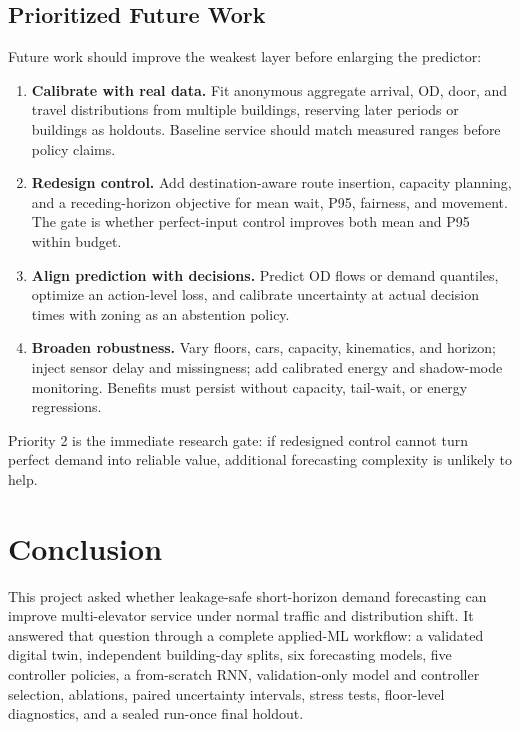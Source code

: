 \documentclass[12pt]{article}
\begin{document}
\subsection{Prioritized Future Work}

Future work should improve the weakest layer before enlarging the predictor:

\begin{enumerate}[leftmargin=0.34in,itemsep=0.20em,topsep=0.20em]
  \item \textbf{Calibrate with real data.} Fit anonymous aggregate arrival, OD,
    door, and travel distributions from multiple buildings, reserving later
    periods or buildings as holdouts. Baseline service should match measured
    ranges before policy claims.
  \item \textbf{Redesign control.} Add destination-aware route insertion,
    capacity planning, and a receding-horizon objective for mean wait, P95,
    fairness, and movement. The gate is whether perfect-input control improves
    both mean and P95 within budget.
  \item \textbf{Align prediction with decisions.} Predict OD flows or demand
    quantiles, optimize an action-level loss, and calibrate uncertainty at
    actual decision times with zoning as an abstention policy.
  \item \textbf{Broaden robustness.} Vary floors, cars, capacity, kinematics,
    and horizon; inject sensor delay and missingness; add calibrated energy and
    shadow-mode monitoring. Benefits must persist without capacity, tail-wait,
    or energy regressions.
\end{enumerate}

Priority 2 is the immediate research gate: if redesigned control cannot turn
perfect demand into reliable value, additional forecasting complexity is
unlikely to help.

\section{Conclusion}
\label{sec:conclusion}

This project asked whether leakage-safe short-horizon demand forecasting can
improve multi-elevator service under normal traffic and distribution shift. It
answered that question through a complete applied-ML workflow: a validated
digital twin, independent building-day splits, six forecasting models, five
controller policies, a from-scratch RNN, validation-only model and controller
selection, ablations, paired uncertainty intervals, stress tests, floor-level
diagnostics, and a sealed run-once final holdout.
\end{document}

